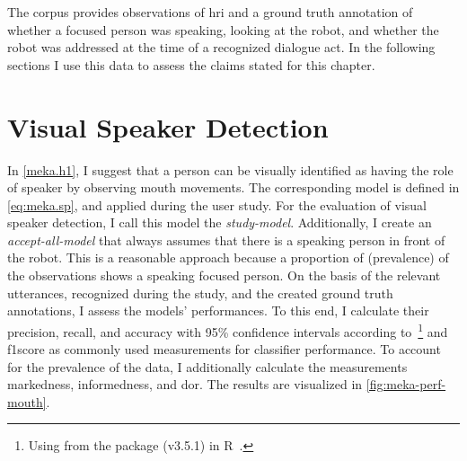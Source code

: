 
The corpus provides observations of \gls{hri} and a ground truth annotation of whether a focused person was speaking, looking at the \gls{robot}, and whether the \gls{robot} was addressed at the time of a recognized dialogue act.
In the following sections I use this data to assess the claims stated for this chapter.

\section{Visual Speaker Detection}\label{sec:meka.h1}

In \cref{meka.h1}, I suggest that a person can be visually identified as having the role of \gls{speaker} by observing mouth movements.
The corresponding model is defined in \cref{eq:meka.sp}, and applied during the user study.
For the evaluation of visual speaker detection, I call this model the \emph{study-model}.
Additionally, I create an \emph{accept-all-model} that always assumes that there is a speaking person in front of the robot.
This is a reasonable approach because a proportion of  (\gls{prevalence}) of the observations shows a speaking focused person.
On the basis of the relevant utterances, recognized during the study, and the created ground truth annotations, I assess the models' performances.
To this end, I calculate their \gls{precision}, \gls{recall}, and \gls{accuracy} with 95\% confidence intervals according to~\footnote{Using  from the  package (v3.5.1) in R~\cite{stats}.} and \gls{f1score} as commonly used measurements for classifier performance.
To account for the \gls{prevalence} of the data, I additionally calculate the measurements \gls{markedness}, \gls{informedness}, and \gls{dor}.
The results are visualized in \cref{fig:meka-perf-mouth}.

